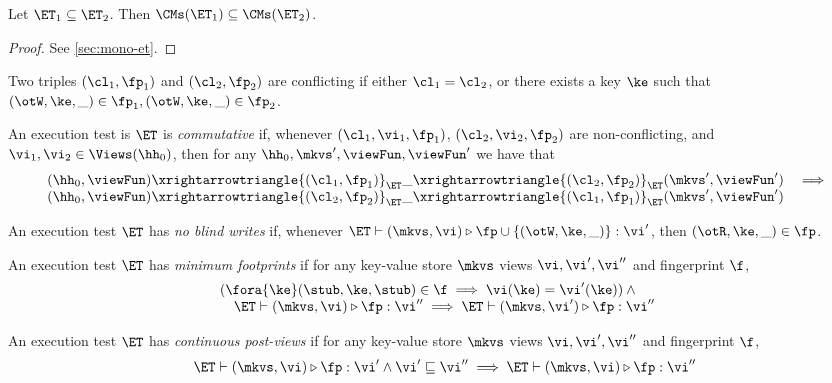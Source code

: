 \begin{proposition}
\label{prop:mono-et}
Let $\ET_1 \subseteq \ET_2$. Then $\CMs(\ET_1) \subseteq \CMs(\ET_2)$.
\end{proposition}
\begin{proof}
    \ifTechReport
    
    \else
    See \cref{sec:mono-et}.
    \fi
\end{proof}

\begin{definition}
Two triples $(\cl_1, \fp_1)$ and $(\cl_2, \fp_2)$ are 
conflicting if either $\cl_1 = \cl_2$, or there exists a key $\ke$ such that 
$(\otW, \ke, \_) \in \fp_1, (\otW, \ke, \_) \in \fp_2$. 

An execution test is $\ET$ is \emph{commutative} if, whenever $(\cl_1, \vi_1, \fp_1)$, 
$(\cl_2, \vi_2, \fp_2)$ are non-conflicting, and $\vi_1, \vi_2 \in \Views(\hh_0)$,  
then for any $\hh_0, \mkvs', \viewFun, \viewFun'$ we have that 
\[
\begin{array}{lr}
(\hh_0, \viewFun) \xrightarrowtriangle{(\cl_1, \fp_1)}_{\ET} 
\_ \xrightarrowtriangle{(\cl_2, \fp_2)}_{\ET} (\mkvs', \viewFun') &\implies \\
(\hh_0, \viewFun) \xrightarrowtriangle{(\cl_2, \fp_2)}_{\ET} 
\_ \xrightarrowtriangle{(\cl_1, \fp_1)}_{\ET} (\mkvs', \viewFun')
\end{array}
\]
\end{definition}

\begin{definition}
An execution test $\ET$ has \emph{no blind writes} if, whenever $\ET \vdash (\mkvs, \vi) \triangleright \fp \cup \{(\otW, \ke, \_)\} : \vi'$, 
then $(\otR, \ke, \_) \in \fp$.
\end{definition}

\begin{definition}
An execution test $\ET$ has \emph{minimum footprints} if for any key-value store \( \mkvs \)
views \( \vi, \vi',\vi''\) and fingerprint \( \f \),
\[
\begin{array}{@{}l@{}}
    ( \fora{ \ke} (\stub, \ke, \stub) \in \f \implies \vi(\ke) = \vi'(\ke) ) \land {} \\
    \quad \ET \vdash (\mkvs, \vi) \triangleright \fp : \vi'' \implies \ET \vdash (\mkvs, \vi') \triangleright \fp : \vi''
\end{array}
\]
\end{definition}

\begin{definition}
An execution test $\ET$ has \emph{continuous post-views} if for any key-value store \( \mkvs \)
views \( \vi, \vi',\vi''\) and fingerprint \( \f \), 
\[
\begin{array}{@{}l@{}}
    \quad \ET \vdash (\mkvs, \vi) \triangleright \fp : \vi' \land \vi' \sqsubseteq \vi'' \implies \ET \vdash (\mkvs, \vi) \triangleright \fp : \vi''
\end{array}
\]
\end{definition}

